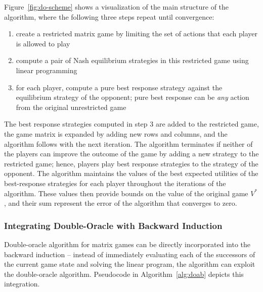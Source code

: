 Figure~\ref{fig:do-scheme} shows a visualization of the main structure of the algorithm, where the following three steps repeat until convergence:
\begin{enumerate}
\item create a restricted matrix game by limiting the set of actions that each player is allowed to play
\item compute a pair of Nash equilibrium strategies in this restricted game using linear programming
\item for each player, compute a pure best response strategy against the equilibrium strategy of the opponent; pure best response can be \emph{any} action from the original unrestricted game
\end{enumerate}
The best response strategies computed in step 3 are added to the restricted game, the game matrix is expanded by adding new rows and columns, and the algorithm follows with the next iteration. The algorithm terminates if neither of the players can improve the outcome of the game by adding a new strategy to the restricted game; hence, players play best response strategies to the strategy of the opponent. The algorithm maintains the values of the best expected utilities of the best-response strategies for each player throughout the iterations of the algorithm. These values then provide bounds on the value of the original game $V^*$, and their sum represent the error of the algorithm that converges to zero.

\subsubsection{Integrating Double-Oracle with Backward Induction}

Double-oracle algorithm for matrix games can be directly incorporated into the backward induction -- instead of immediately evaluating each of the successors of the current game state and solving the linear program, the algorithm can exploit the double-oracle algorithm. Pseudocode in Algorithm~\ref{alg:doab} depicts this integration. 

